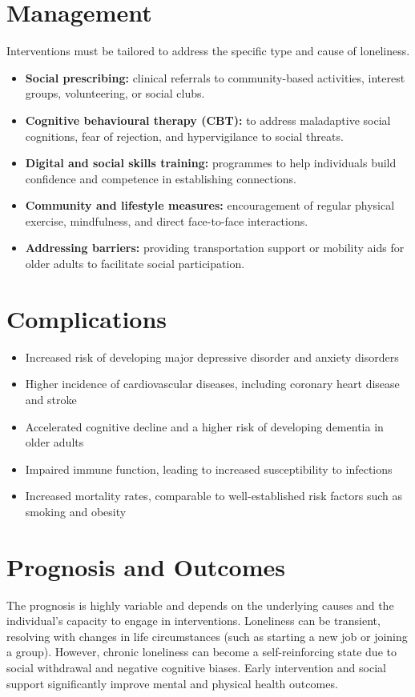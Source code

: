 \section*{Management}
Interventions must be tailored to address the specific type and cause of loneliness.
\begin{itemize}
    \item \textbf{Social prescribing:} clinical referrals to community-based activities, interest groups, volunteering, or social clubs.
    \item \textbf{Cognitive behavioural therapy (CBT):} to address maladaptive social cognitions, fear of rejection, and hypervigilance to social threats.
    \item \textbf{Digital and social skills training:} programmes to help individuals build confidence and competence in establishing connections.
    \item \textbf{Community and lifestyle measures:} encouragement of regular physical exercise, mindfulness, and direct face-to-face interactions.
    \item \textbf{Addressing barriers:} providing transportation support or mobility aids for older adults to facilitate social participation.
\end{itemize}

\section*{Complications}
\begin{itemize}
    \item Increased risk of developing major depressive disorder and anxiety disorders
    \item Higher incidence of cardiovascular diseases, including coronary heart disease and stroke
    \item Accelerated cognitive decline and a higher risk of developing dementia in older adults
    \item Impaired immune function, leading to increased susceptibility to infections
    \item Increased mortality rates, comparable to well-established risk factors such as smoking and obesity
\end{itemize}

\section*{Prognosis and Outcomes}
The prognosis is highly variable and depends on the underlying causes and the individual's capacity to engage in interventions. Loneliness can be transient, resolving with changes in life circumstances (such as starting a new job or joining a group). However, chronic loneliness can become a self-reinforcing state due to social withdrawal and negative cognitive biases. Early intervention and social support significantly improve mental and physical health outcomes.

